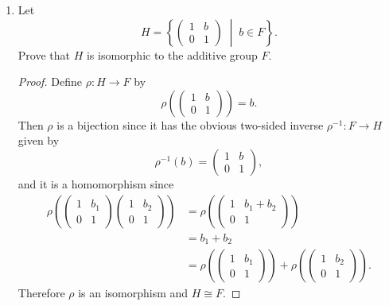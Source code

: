 \begin{enumerate}
\item Let
  \begin{equation*}
    H = \left\{
      \begin{pmatrix}
        1 & b \\ 0 & 1
      \end{pmatrix}
      \;\middle|\;
      b\in F
    \right\}.
  \end{equation*}
  Prove that $H$ is isomorphic to the additive group $F$.
  \begin{proof}
    Define $\rho\colon H\to F$ by
    \begin{equation*}
      \rho\left(
        \begin{pmatrix}
          1 & b \\
          0 & 1
        \end{pmatrix}
      \right) = b.
    \end{equation*}
    Then $\rho$ is a bijection since it has the obvious two-sided
    inverse $\rho^{-1}\colon F\to H$ given by
    \begin{equation*}
      \rho^{-1}(b) =
      \begin{pmatrix}
        1 & b \\
        0 & 1
      \end{pmatrix},
    \end{equation*}
    and it is a homomorphism since
    \begin{align*}
      \rho\left(
      \begin{pmatrix}
        1 & b_1 \\ 0 & 1
      \end{pmatrix}
      \begin{pmatrix}
        1 & b_2 \\ 0 & 1
      \end{pmatrix}
      \right)
      &= \rho\left(
        \begin{pmatrix}
          1 & b_1 + b_2 \\ 0 & 1
        \end{pmatrix}
      \right) \\
      &= b_1 + b_2 \\
      &= \rho\left(
      \begin{pmatrix}
        1 & b_1 \\ 0 & 1
      \end{pmatrix}\right) +
      \rho\left(\begin{pmatrix}
        1 & b_2 \\ 0 & 1
      \end{pmatrix}
      \right).
    \end{align*}
    Therefore $\rho$ is an isomorphism and $H\cong F$.
  \end{proof}
\end{enumerate}

